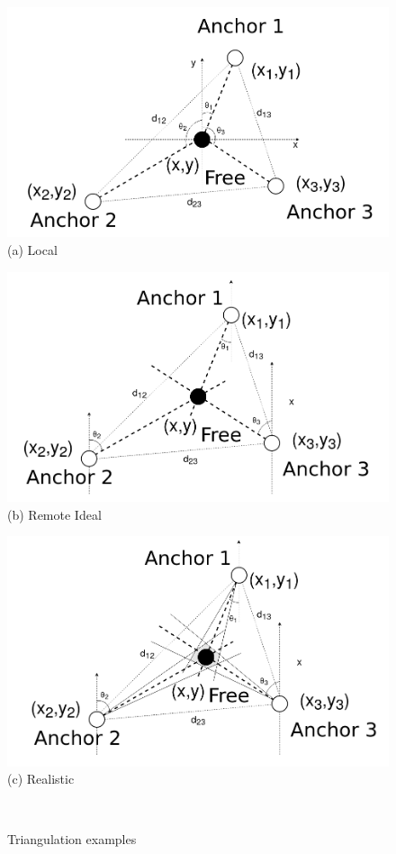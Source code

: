 \begin{figure} [H]
	\centering
	\hspace*{+2cm}\begin{minipage}{0.4\textwidth}
		\centering
		\includegraphics[width=0.8\linewidth]{../Photos/Tringulation-local.png}\\
		{(a) Local}
	\end{minipage}
	\newline
	\hspace*{+1cm}\begin{minipage}{.4\textwidth}
		\centering
		\includegraphics[width=.8\linewidth]{../Photos/Tringulation-remote.png}\\
		{(b) Remote Ideal}
	\end{minipage}%
	\begin{minipage}{.4\textwidth}
		\centering
		\includegraphics[width=.8\linewidth]{../Photos/Tringulation-remote-actual.png}\\
		{(c) Realistic}
	\end{minipage}
	\hfill \break \\
	\decoRule
	\caption[Triangulation examples]{Triangulation examples}
	\label{fig:Triangulation-examples}
\end{figure}

